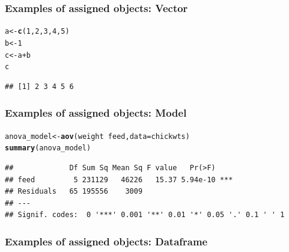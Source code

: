 \documentclass{beamer}\usepackage[]{graphicx}\usepackage[]{color}
\makeatletter
\newcommand{\hlnum}[1]{\textcolor[rgb]{0.686,0.059,0.569}{#1}}%
\newcommand{\hlopt}[1]{\textcolor[rgb]{0,0,0}{#1}}%
\newcommand{\hlstd}[1]{\textcolor[rgb]{0.345,0.345,0.345}{#1}}%
\newcommand{\hlkwb}[1]{\textcolor[rgb]{0.69,0.353,0.396}{#1}}%
\newcommand{\hlkwc}[1]{\textcolor[rgb]{0.333,0.667,0.333}{#1}}%
\newcommand{\hlkwd}[1]{\textcolor[rgb]{0.737,0.353,0.396}{\textbf{#1}}}%
\newenvironment{kframe}{%
 \def\at@end@of@kframe{}%
 \ifinner\ifhmode%
  \def\at@end@of@kframe{\end{minipage}}%
  \begin{minipage}{\columnwidth}%
 \fi\fi%
 \def\FrameCommand##1{\hskip\@totalleftmargin \hskip-\fboxsep
 \colorbox{shadecolor}{##1}\hskip-\fboxsep
     \hskip-\linewidth \hskip-\@totalleftmargin \hskip\columnwidth}%
 \MakeFramed {\advance\hsize-\width
   \@totalleftmargin\z@ \linewidth\hsize
   \@setminipage}}%
 {\par\unskip\endMakeFramed%
 \at@end@of@kframe}
\newenvironment{knitrout}{}{} %
\makeatother
\begin{document}
{{{%

\begin{frame}[fragile]
\frametitle{Examples of assigned objects: Vector}
\begin{knitrout}\scriptsize
{}\color{fgcolor}\begin{kframe}
\begin{alltt}
\hlstd{a} \hlkwb{<-} \hlkwd{c}\hlstd{(}\hlnum{1}\hlstd{,} \hlnum{2}\hlstd{,} \hlnum{3}\hlstd{,} \hlnum{4}\hlstd{,} \hlnum{5}\hlstd{)}
\hlstd{b} \hlkwb{<-} \hlnum{1}
\hlstd{c} \hlkwb{<-} \hlstd{a} \hlopt{+} \hlstd{b}
\hlstd{c}
\end{alltt}
\begin{verbatim}
## [1] 2 3 4 5 6
\end{verbatim}
\end{kframe}
\end{knitrout}
\end{frame}


\begin{frame}[fragile]
\frametitle{Examples of assigned objects: Model}
\begin{knitrout}\scriptsize
{}\color{fgcolor}\begin{kframe}
\begin{alltt}
\hlstd{anova_model} \hlkwb{<-} \hlkwd{aov}\hlstd{(weight} \hlopt{~} \hlstd{feed,} \hlkwc{data} \hlstd{= chickwts)}
\hlkwd{summary}\hlstd{(anova_model)}
\end{alltt}
\begin{verbatim}
##             Df Sum Sq Mean Sq F value   Pr(>F)    
## feed         5 231129   46226   15.37 5.94e-10 ***
## Residuals   65 195556    3009                     
## ---
## Signif. codes:  0 '***' 0.001 '**' 0.01 '*' 0.05 '.' 0.1 ' ' 1
\end{verbatim}
\end{kframe}
\end{knitrout}
\end{frame}


\begin{frame}[fragile]
\frametitle{Examples of assigned objects: Dataframe}


\end{frame}}}}
\end{document}
